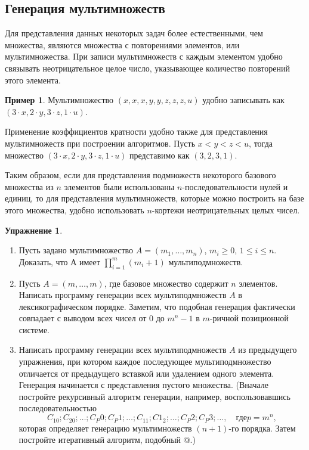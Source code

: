 \documentclass[12pt,a4paper]{article}
\theoremstyle{plain}
\theoremstyle{definition}
\newtheorem*{task}{Упражнение}
\newtheorem*{example}{Пример}
\theoremstyle{remark}
\begin{document}
\subsection{Генерация мультимножеств}

Для представления данных некоторых задач более естественными, чем множества, являются множества с повторениями элементов, или мультимножества. При записи мультимножеств с каждым элементом удобно связывать неотрицательное целое число, указывающее количество повторений этого элемента.

\begin{example}
Мультимножество $(x, x, x, y, y, z, z, z, u)$ удобно записывать как $(3\cdot x, 2\cdot y, 3\cdot z, 1\cdot u)$.
\end{example}

Применение коэффициентов кратности удобно также для представления мультимножеств при построении алгоритмов. Пусть $x<y<z<u$, тогда множество $(3\cdot x, 2\cdot y, 3\cdot z, 1\cdot u)$ представимо как $(3,2,3,1)$.

Таким образом, если для представления подмножеств некоторого базового множества из $n$ элементов были использованы $n$-последовательности нулей и единиц, то для представления мультимножеств, которые можно построить на базе этого множества, удобно использовать $n$-кортежи неотрицательных целых чисел.

\begin{task}
~\\
\begin{enumerate}
\item Пусть задано мультимножество $A=(m_1,\ldots,m_n)$, $m_i\ge0$, $1\le i\le n$. Доказать, что А имеет $\prod_{i=1}^m (m_i + 1)$ мультиподмножеств.
\item Пусть $A=(m,\ldots,m)$, где базовое множество содержит $n$ элементов. Написать программу генерации всех мультиподмножеств $A$ в лексикографическом порядке. Заметим, что подобная генерация фактически совпадает с выводом всех чисел от $0$ до $m^n-1$ в $m$-ричной позиционной системе.
\item Написать программу генерации всех мультиподмножеств $A$ из предыдущего упражнения, при котором каждое последующее мультиподмножество отличается от предыдущего вставкой или удалением одного элемента. Генерация начинается с представления пустого множества. (Вначале постройте рекурсивный алгоритм генерации, например, воспользовавшись последовательностью
\[ C_10; C_20; \ldots; C_P0; C_P1; \ldots; C_11; C1_2; \ldots; C_P2; C_P3;\ldots, \quad \text{где} p=m^n, \]
которая определяет генерацию мультимножеств $(n+1)$-го порядка. Затем постройте итеративный алгоритм, подобный @.)
\end{enumerate}
\end{task}
\end{document}
